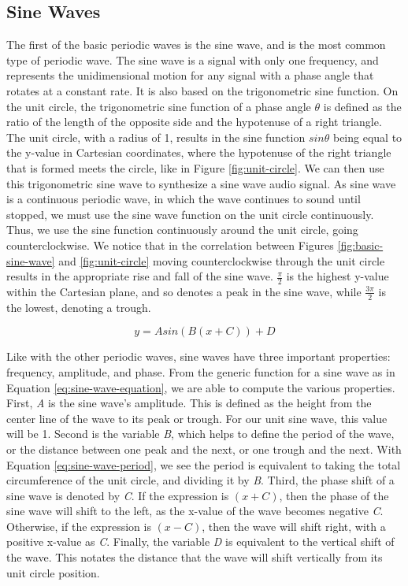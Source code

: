 \subsection{Sine Waves}\label{subsection:sine-waves}
The first of the basic periodic waves is the sine wave, and is the most common type of periodic wave. The sine wave is a signal with only one frequency, and represents the unidimensional motion for any signal with a phase angle that rotates at a constant rate. It is also based on the trigonometric sine function. On the unit circle, the trigonometric sine function of a phase angle $\theta$ is defined as the ratio of the length of the opposite side and the hypotenuse of a right triangle. The unit circle, with a radius of 1, results in the sine function $sin\theta$ being equal to the y-value in Cartesian coordinates, where the hypotenuse of the right triangle that is formed meets the circle, like in Figure \ref{fig:unit-circle}. We can then use this trigonometric sine wave to synthesize a sine wave audio signal. As sine wave is a continuous periodic wave, in which the wave continues to sound until stopped, we must use the sine wave function on the unit circle continuously. Thus, we use the sine function continuously around the unit circle, going counterclockwise. We notice that in the correlation between Figures \ref{fig:basic-sine-wave} and \ref{fig:unit-circle} moving counterclockwise through the unit circle results in the appropriate rise and fall of the sine wave. $\frac{\pi}{2}$ is the highest y-value within the Cartesian plane, and so denotes a peak in the sine wave, while $\frac{3\pi}{2}$ is the lowest, denoting a trough.

\begin{equation}
	y = Asin(B(x + C)) + D
	\label{eq:sine-wave-equation}
\end{equation}

Like with the other periodic waves, sine waves have three important properties: frequency, amplitude, and phase. From the generic function for a sine wave as in Equation \ref{eq:sine-wave-equation}, we are able to compute the various properties. First, \textit{A} is the sine wave's amplitude. This is defined as the height from the center line of the wave to its peak or trough. For our unit sine wave, this value will be 1. Second is the variable \textit{B}, which helps to define the period of the wave, or the distance between one peak and the next, or one trough and the next. With Equation \ref{eq:sine-wave-period}, we see the period is equivalent to taking the total circumference of the unit circle, and dividing it by \textit{B}. Third, the phase shift of a sine wave is denoted by \textit{C}. If the expression is $(x + C)$, then the phase of the sine wave will shift to the left, as the x-value of the wave becomes negative \textit{C}. Otherwise, if the expression is $(x - C)$, then the wave will shift right, with a positive x-value as \textit{C}. Finally, the variable \textit{D} is equivalent to the vertical shift of the wave. This notates the distance that the wave will shift vertically from its unit circle position.

